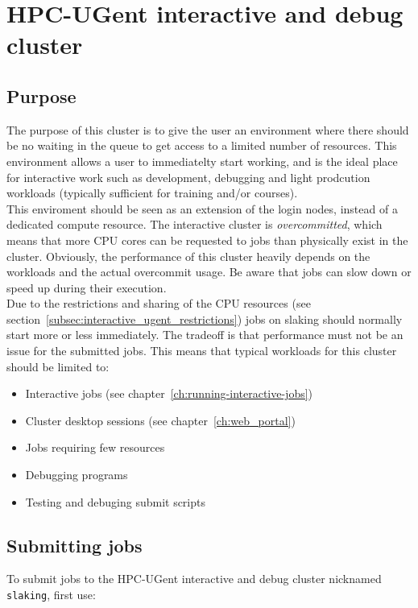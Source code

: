 \chapter{HPC-UGent interactive and debug cluster}
\label{ch:interactive_ugent}


\section{Purpose}
\label{sec:interactive_ugent_pupose}
The purpose of this cluster is to give the user an environment where
there should be no waiting in the queue to get access to a limited
number of resources. This environment allows a user to immediatelty
start working, and is the ideal place for interactive work such as
development, debugging and light prodcution workloads (typically sufficient
for training and/or courses). \\ This enviroment should be seen as an
extension of the login nodes, instead of a dedicated compute resource.
The interactive cluster is \emph{overcommitted}, which means that more CPU cores can be
requested to jobs than physically exist in the cluster. Obviously, the performance of this cluster
heavily depends on the workloads and the actual overcommit usage. Be aware that jobs can slow
down or speed up during their execution.
 \\
Due to the restrictions and sharing of the CPU resources (see section~\ref{subsec:interactive_ugent_restrictions}) 
jobs on slaking should normally start more or less immediately.
The tradeoff is that performance must not be an issue for the submitted jobs.
This means that typical workloads for this cluster should be limited to:
\begin{itemize}
  \item  Interactive jobs (see chapter~\ref{ch:running-interactive-jobs})
  \item  Cluster desktop sessions (see chapter~\ref{ch:web_portal})
  \item  Jobs requiring few resources
  \item  Debugging programs
  \item  Testing and debuging submit scripts
\end{itemize} 

\section{Submitting jobs}
\label{sec:interactive_ugent_jobs}

To submit jobs to the HPC-UGent interactive and debug cluster nicknamed \lstinline|slaking|, first use:

